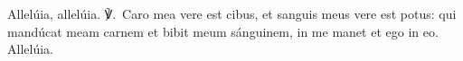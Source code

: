 Allelúia, allelúia.
℣. Caro mea vere est cibus, et sanguis meus vere est potus: qui mandúcat meam carnem et bibit meum sánguinem, in me manet et ego in eo. Allelúia.
